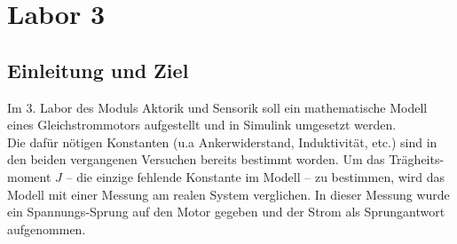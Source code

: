 \section{Labor 3}

\subsection{Einleitung und Ziel}

Im 3. Labor des Moduls Aktorik und Sensorik soll ein mathematische Modell
eines Gleichstrommotors aufgestellt und in Simulink umgesetzt werden.\\

Die dafür nötigen Konstanten (u.a Ankerwiderstand, Induktivität, etc.)
sind in den beiden vergangenen Versuchen bereits bestimmt worden.
Um das Trägheits-moment $J$ -- die einzige fehlende Konstante im Modell --
zu bestimmen, wird das Modell mit einer Messung am realen System
verglichen. In dieser Messung wurde ein Spannungs-Sprung auf den Motor
gegeben und der Strom als Sprungantwort aufgenommen.